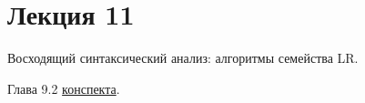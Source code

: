 \section{Лекция 11}

Восходящий синтаксический анализ: алгоритмы семейства LR.


Глава 9.2 \href{https://github.com/YaccConstructor/articles/blob/master/InProgress/Formal_langs_CFPQ_course_notes/Formal_lang_CFPQ_course_notes.pdf}{конспекта}.
